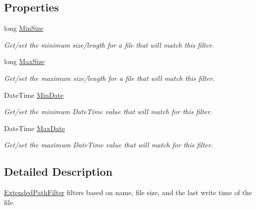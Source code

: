 \subsection*{Properties}
\begin{DoxyCompactItemize}
\item 
long \hyperlink{class_i_c_sharp_code_1_1_sharp_zip_lib_1_1_core_1_1_extended_path_filter_acdc6135cebbfca7a3263fe9ce1c72bc7}{Min\+Size}
\begin{DoxyCompactList}\small\item\em Get/set the minimum size/length for a file that will match this filter. \end{DoxyCompactList}\item 
long \hyperlink{class_i_c_sharp_code_1_1_sharp_zip_lib_1_1_core_1_1_extended_path_filter_acd1bf418b764a27b2e7a87746e4b3867}{Max\+Size}
\begin{DoxyCompactList}\small\item\em Get/set the maximum size/length for a file that will match this filter. \end{DoxyCompactList}\item 
Date\+Time \hyperlink{class_i_c_sharp_code_1_1_sharp_zip_lib_1_1_core_1_1_extended_path_filter_a71a60192bcfcb2e79b4f3a01628c29ee}{Min\+Date}
\begin{DoxyCompactList}\small\item\em Get/set the minimum Date\+Time value that will match for this filter. \end{DoxyCompactList}\item 
Date\+Time \hyperlink{class_i_c_sharp_code_1_1_sharp_zip_lib_1_1_core_1_1_extended_path_filter_aba31cfad2ecb1b385c93b2520455cf88}{Max\+Date}
\begin{DoxyCompactList}\small\item\em Get/set the maximum Date\+Time value that will match for this filter. \end{DoxyCompactList}\end{DoxyCompactItemize}


\subsection{Detailed Description}
\hyperlink{class_i_c_sharp_code_1_1_sharp_zip_lib_1_1_core_1_1_extended_path_filter}{Extended\+Path\+Filter} filters based on name, file size, and the last write time of the file. 


